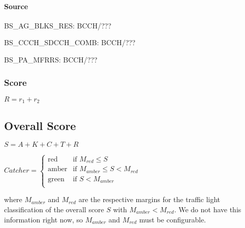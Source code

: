\documentclass[a4paper,11pt,notitlepage,bigheadings,oneside]{scrartcl}
\begin{document}
\paragraph{Source}

BS\_AG\_BLKS\_RES: BCCH/???




BS\_CCCH\_SDCCH\_COMB: BCCH/???



BS\_PA\_MFRRS: BCCH/???



\subsubsection{Score}

$R = r_1 + r_2$

\subsection{Overall Score}

$S = A + K + C + T + R$

$Catcher =
\begin{cases}
	\text{red}   & \text{if } M_{red} \leq S \\
        \text{amber} & \text{if } M_{amber} \leq S < M_{red} \\
        \text{green} & \text{if } S < M_{amber} \\
\end{cases}
$

where $M_{amber}$ and $M_{red}$ are the respective margins for the traffic
light classification of the overall score $S$ with $M_{amber} < M_{red}$. We do
not have this information right now, so $M_{amber}$ and $M_{red}$ must be
configurable.



\end{document}
